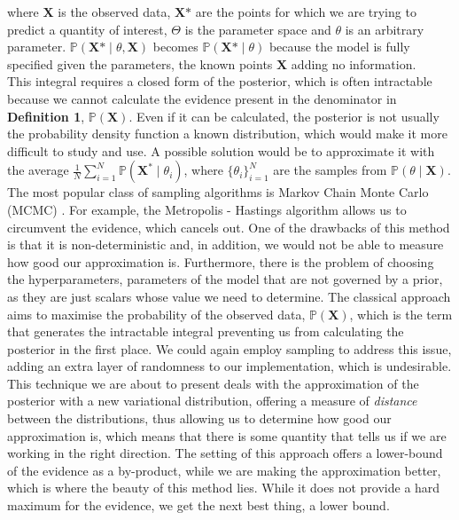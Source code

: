 \documentclass[12pt]{report}
\newcommand{\bs}{\boldsymbol}
\renewcommand{\P}{\mathbb{P}}
\renewcommand{\bs}{\boldsymbol}
\begin{document}
\noindent
where $\textbf{X}$ is the observed data, $\textbf{X*}$ are the points for which we are trying to predict a quantity of interest, $\Theta$ is the parameter space and $\theta$ is an arbitrary parameter. $\P(\textbf{X*} \mid \theta, \textbf{X})$ becomes $\P(\textbf{X*} \mid \theta)$ because the model is fully specified given the parameters, the known points $\bs{X}$ adding no information. \\

\noindent
This integral requires a closed form of the posterior, which is often intractable because we cannot calculate the evidence present in the denominator in \textbf{Definition 1}, $\P(\bs{X})$. Even if it can be calculated, the posterior is not usually the probability density function a known distribution, which would make it more difficult to study and use. A possible solution would be to approximate it with the average $\frac{1}{N}\sum\limits_{i = 1}^N \P(\bs{X^*} \mid \theta_i)$, where $\{\theta_i\}_{i = 1}^N$ are the samples from $\P(\theta \mid \bs{X})$. The most popular class of sampling algorithms is Markov Chain Monte Carlo (MCMC) . For example, the Metropolis - Hastings algorithm allows us to circumvent the evidence, which cancels out. One of the drawbacks of this method is that it is non-deterministic and, in addition, we would not be able to measure how good our approximation is. Furthermore, there is the problem of choosing the hyperparameters, parameters of the model that are not governed by a prior, as they are just scalars whose value we need to determine. The classical approach aims to maximise the probability of the observed data, $\P(\bs{X})$, which is the term that generates the intractable integral preventing us from calculating the posterior in the first place. We could again employ sampling to address this issue, adding an extra layer of randomness to our implementation, which is undesirable. This technique we are about to present deals with the approximation of the posterior with a new variational distribution, offering a measure of \textit{distance} between the distributions, thus allowing us to determine how good our approximation is, which means that there is some quantity that tells us if we are working in the right direction. The setting of this approach offers a lower-bound of the evidence as a by-product, while we are making the approximation better, which is where the beauty of this method lies. While it does not provide a hard maximum for the evidence, we get the next best thing, a lower bound. \\
\end{document}
